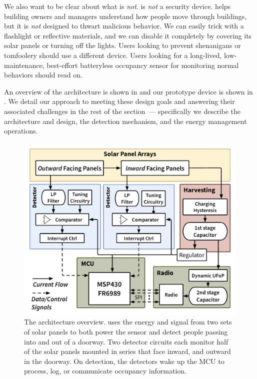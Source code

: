 We also want to be clear about what \sysname is \emph{not}.
\sysname is \emph{not} a security device.
\sysname helps building owners and managers understand how people move through buildings, but it is \emph{not} designed to thwart malicious behavior.
We can easily trick \sysname with a flashlight or reflective materials, and we can disable it completely by covering its solar panels or turning off the lights.
Users looking to prevent shenanigans or tomfoolery should use a different device.
Users looking for a long-lived, low-maintenance, best-effort batteryless occupancy sensor for monitoring normal behaviors should read on.

An overview of the \sysname architecture is shown in  and our \sysname prototype device is shown in .
We detail our approach to meeting these design goals and answering their associated challenges in the rest of the section~--- specifically we describe the \sysname architecture and design, the detection mechanism, and the energy management operations.


\begin{figure}[t]
\centering
\includegraphics[width=\columnwidth]{figs/overview.pdf}
\caption{The \sysname architecture overview. \sysname uses the energy and signal from two sets of solar panels to both power the sensor and detect people passing into and out of a doorway. Two detector circuits each monitor half of the solar panels mounted in series that face inward, and outward in the doorway. On detection, the detectors wake up the MCU to process, log, or communicate occupancy information.  \label{fig:overview}}
\end{figure}


